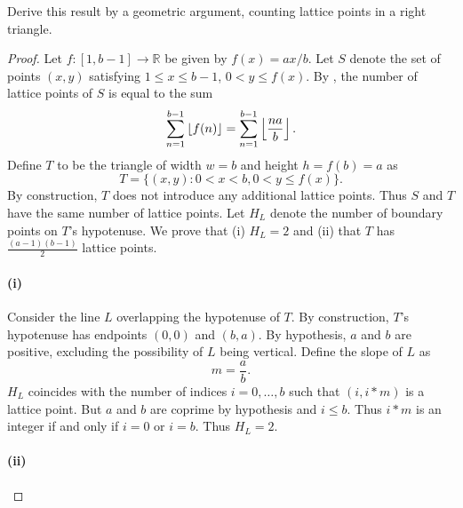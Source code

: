 \documentclass{report}
\begin{document}
Derive this result by a geometric argument, counting lattice points in a right
  triangle.

\begin{proof}

  Let $f \colon [1, b - 1] \rightarrow \mathbb{R}$ be given by $f(x) = ax / b$.
  Let $S$ denote the set of points $(x, y)$ satisfying $1 \leq x \leq b - 1$,
    $0 < y \leq f(x)$.
  By , the number of lattice points of $S$ is equal
    to the sum
    \begin{equation}
      \label{ssub:exercise-1.11.7a-eq1}
      \sum_{n=1}^{b-1} \left\lfloor f(n)\right\rfloor = \sum_{n=1}^{b-1} \left\lfloor\frac{na}{b}\right\rfloor.
    \end{equation}
  Define $T$ to be the triangle of width $w = b$ and height $h = f(b) = a$
    as $$T = \{ (x, y) : 0 < x < b, 0 < y \leq f(x) \}.$$
  By construction, $T$ does not introduce any additional lattice points.
  Thus $S$ and $T$ have the same number of lattice points.
  Let $H_L$ denote the number of boundary points on $T$'s hypotenuse.
  We prove that (i) $H_L = 2$ and (ii) that $T$ has $\frac{(a - 1)(b - 1)}{2}$
    lattice points.

  \paragraph{(i)}%
  \label{par:exercise-1.11.7a-i}

    Consider the line $L$ overlapping the hypotenuse of $T$.
    By construction, $T$'s hypotenuse has endpoints $(0, 0)$ and $(b, a)$.
    By hypothesis, $a$ and $b$ are positive, excluding the possibility of $L$
      being vertical.
    Define the slope of $L$ as $$m = \frac{a}{b}.$$
    $H_L$ coincides with the number of indices $i = 0, \ldots, b$ such that
      $(i, i * m)$ is a lattice point.
    But $a$ and $b$ are coprime by hypothesis and $i \leq b$.
    Thus $i * m$ is an integer if and only if $i = 0$ or $i = b$.
    Thus $H_L = 2$.

  \paragraph{(ii)}%


\end{proof}
\end{document}
